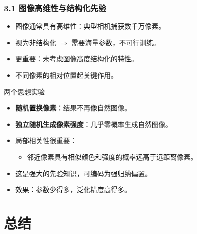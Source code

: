 \documentclass[t,aspectratio=169]{beamer} %
\begin{document}
\begin{frame}
    \frametitle{3.1 图像高维性与结构化先验}
    \begin{itemize}
        \item 图像通常具有\alert{高维性}：典型相机捕获数千万像素。
        \item 视为非结构化 $\Rightarrow$ 需要\alert{海量参数}，不可行训练。
        \item 更重要：未考虑图像\alert{高度结构化}的特性。
        \item 不同像素的\alert{相对位置}起关键作用。
    \end{itemize}
    \begin{block}{两个思想实验}
        \begin{itemize}
            \item \textbf{随机置换像素}：结果不再像自然图像。
            \item \textbf{独立随机生成像素强度}：几乎零概率生成自然图像。
        \end{itemize}
    \end{block}
    \begin{itemize}
        \item \alert{局部相关性}很重要：
        \begin{itemize}
            \item 邻近像素具有相似颜色和强度的概率远高于远距离像素。
        \end{itemize}
        \item 这是\alert{强大的先验知识}，可编码为强归纳偏置。
        \item 效果：\alert{参数少得多}，\alert{泛化精度高得多}。
    \end{itemize}
\end{frame}

\section{总结}
\end{document}
